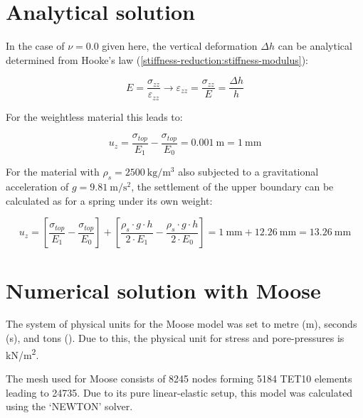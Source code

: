 \section{Analytical solution}

In the case of $\nu = 0.0$ given here, the vertical deformation $\Delta h$ can
be analytical determined from Hooke's law
(\autoref{stiffness-reduction:stiffness-modulus}):

\begin{equation}
    \label{stiffness-reduction:stiffness-modulus}
    E = \frac{\sigma_{zz}}{\varepsilon_{zz}} \rightarrow \varepsilon_{zz}
    = \frac{\sigma_{zz}}{E} = \frac{\Delta h}{h}
\end{equation}

For the weightless material this leads to:

\begin{equation}
    u_z = \frac{\sigma_{top}}{E_1} - \frac{\sigma_{top}}{E_0} = \SI{0.001}{\metre} = \SI{1}{\milli\metre}
\end{equation}

For the material with $\rho_s = \qty[per-mode
        =symbol]{2500}{\kilogram\per\cubic\metre}$ also subjected to a gravitational
acceleration of $g = \qty[per-mode = symbol]{9.81}{\metre\per\square\second}$,
the settlement of the upper boundary can be calculated as for a spring under
its own weight:

\begin{equation}
    u_z = \left[ \frac{\sigma_{top}}{E_1} - \frac{\sigma_{top}}{E_0} \right] + \left[\frac{\rho_s \cdot g \cdot h}{2 \cdot E_1} - \frac{\rho_s \cdot g \cdot h}{2 \cdot E_0} \right] = \qty{1}{\milli\metre} + \qty{12.26}{\milli\metre} = \qty{13.26}{\milli\metre}
\end{equation}

\section{Numerical solution with Moose}

The system of physical units for the Moose model was set to metre
(\unit{\metre}), seconds (\unit{\second}), and tons (\unit{\ton}). Due to this,
the physical unit for stress and pore-pressures is \unit[per-mode =
    symbol]{\kilo\newton\per\square\metre}.

The mesh used for Moose consists of \qty{8245}{} nodes forming \qty{5184}{}
TET10 elements leading to \qty{24735}{\DOF}. Due to its pure linear-elastic
setup, this model was calculated using the ‘NEWTON’ solver.

